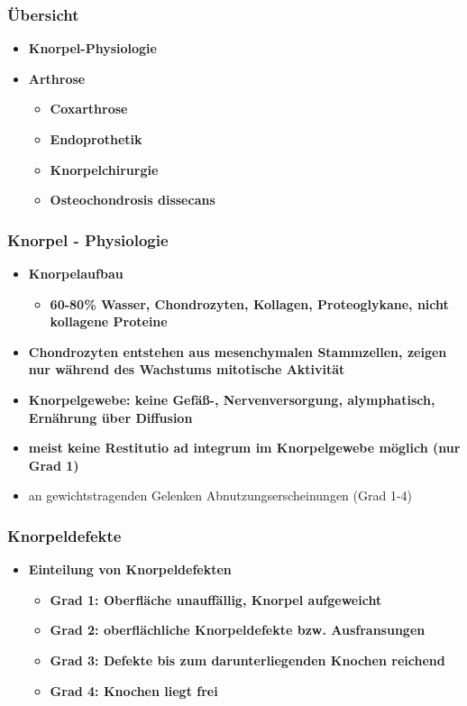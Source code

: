 	\subsubsection{Übersicht}
		\begin{itemize}
			\item \textbf{Knorpel-Physiologie}
			\item \textbf{Arthrose}
				\begin{itemize}
					\item \textbf{Coxarthrose}
					\item \textbf{Endoprothetik}
					\item \textbf{Knorpelchirurgie}
					\item \textbf{Osteochondrosis dissecans}
		 		\end{itemize}
		\end{itemize}
	\subsubsection{Knorpel - Physiologie}
		\begin{itemize}
			\item \textbf{Knorpelaufbau}
				\begin{itemize}
					\item \textbf{60-80\% Wasser, Chondrozyten, Kollagen, Proteoglykane, nicht kollagene Proteine}
				\end{itemize}
			\item \textbf{Chondrozyten entstehen aus mesenchymalen Stammzellen, zeigen nur während des Wachstums mitotische Aktivität}
			\item \textbf{Knorpelgewebe: keine Gefäß-, Nervenversorgung, alymphatisch, Ernährung über Diffusion}
			\item \textbf{meist keine Restitutio ad integrum im Knorpelgewebe möglich (nur Grad 1)}
			\item an gewichtstragenden Gelenken Abnutzungserscheinungen (Grad 1-4)
	 	\end{itemize}
	\subsubsection{Knorpeldefekte}
		\begin{itemize}
			\item \textbf{Einteilung von Knorpeldefekten}
				\begin{itemize}
					\item \textbf{Grad 1: Oberfläche unauffällig, Knorpel aufgeweicht}
					\item \textbf{Grad 2: oberflächliche Knorpeldefekte bzw. Ausfransungen}
					\item \textbf{Grad 3: Defekte bis zum darunterliegenden Knochen reichend}
					\item \textbf{Grad 4: Knochen liegt frei}
				\end{itemize}
	  	\end{itemize}

